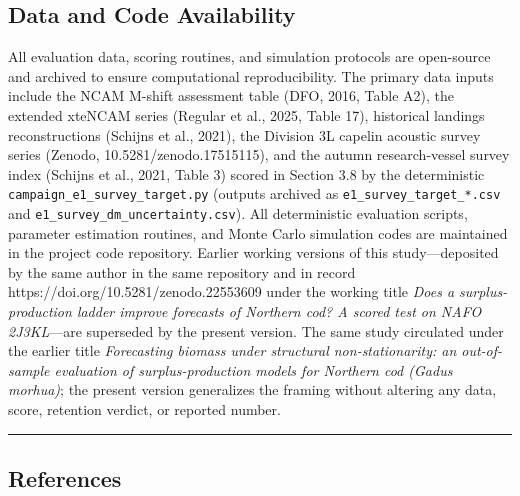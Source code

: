 \documentclass[11pt]{article}
\begin{document}
\subsection{Data and Code
Availability}\label{data-and-code-availability}

All evaluation data, scoring routines, and simulation protocols are
open-source and archived to ensure computational reproducibility. The
primary data inputs include the NCAM M-shift assessment table (DFO,
2016, Table A2), the extended xteNCAM series (Regular et al., 2025,
Table 17), historical landings reconstructions (Schijns et al., 2021),
the Division 3L capelin acoustic survey series (Zenodo,
10.5281/zenodo.17515115), and the autumn research-vessel survey index
(Schijns et al., 2021, Table 3) scored in Section 3.8 by the
deterministic \texttt{campaign\_e1\_survey\_target.py} (outputs archived
as \texttt{e1\_survey\_target\_*.csv} and
\texttt{e1\_survey\_dm\_uncertainty.csv}). All deterministic evaluation
scripts, parameter estimation routines, and Monte Carlo simulation codes
are maintained in the project code repository. Earlier working versions
of this study---deposited by the same author in the same repository and
in record https://doi.org/10.5281/zenodo.22553609 under the working
title \emph{Does a surplus-production ladder improve forecasts of
Northern cod? A scored test on NAFO 2J3KL}---are superseded by the
present version. The same study circulated under the earlier title
\emph{Forecasting biomass under structural non-stationarity: an
out-of-sample evaluation of surplus-production models for Northern cod
(Gadus morhua)}; the present version generalizes the framing without
altering any data, score, retention verdict, or reported number.

\begin{center}\rule{0.5\linewidth}{0.5pt}\end{center}

\subsection{References}\label{references}
\end{document}
